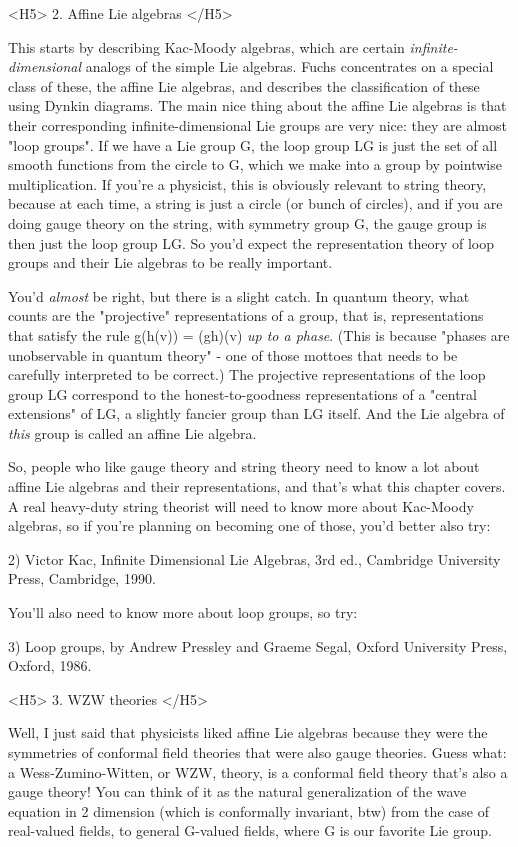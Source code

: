 <H5> 2.  Affine Lie algebras </H5>

This starts by describing Kac-Moody algebras, which are certain
\emph{infinite-dimensional} analogs of the simple Lie algebras.  Fuchs
concentrates on a special class of these, the affine Lie algebras, and
describes the classification of these using Dynkin diagrams.  The main
nice thing about the affine Lie algebras is that their corresponding
infinite-dimensional Lie groups are very nice: they are almost "loop
groups".  If we have a Lie group G, the loop group LG is just the set of
all smooth functions from the circle to G, which we make into a group by
pointwise multiplication.  If you're a physicist, this is obviously
relevant to string theory, because at each time, a string is just a
circle (or bunch of circles), and if you are doing gauge theory on 
the string, with symmetry group G, the gauge group is then just the loop
group LG.  So you'd expect the representation theory of loop groups
and their Lie algebras to be really important.  

You'd \emph{almost} be right, but there is a slight catch.  In quantum
theory, what counts are the "projective" representations of a group,
that is, representations that satisfy the rule g(h(v)) = (gh)(v) 
\emph{up to a phase}.  (This is because "phases are unobservable in quantum
theory" - one of those mottoes that needs to be carefully interpreted
to be correct.)  The projective representations of the loop group LG
correspond to the honest-to-goodness representations of a "central
extensions" of LG, a slightly fancier group than LG itself.  And the
Lie algebra of \emph{this} group is called an affine Lie algebra.

So, people who like gauge theory and string theory need to know a
lot about affine Lie algebras and their representations, and that's
what this chapter covers.  A real heavy-duty string theorist will
need to know more about Kac-Moody algebras, so if you're planning
on becoming one of those, you'd better also try:

2) Victor Kac, Infinite Dimensional Lie Algebras, 3rd ed.,
Cambridge University Press, Cambridge, 1990.

You'll also need to know more about loop groups, so try:

3) Loop groups, by Andrew Pressley and Graeme Segal, Oxford University
Press, Oxford, 1986. 

<H5> 3.  WZW theories </H5>

Well, I just said that physicists liked affine Lie algebras because they
were the symmetries of conformal field theories that were also gauge
theories.  Guess what: a Wess-Zumino-Witten, or WZW, theory, is a
conformal field theory that's also a gauge theory!  You can think of it
as the natural generalization of the wave equation in 2 dimension (which
is conformally invariant, btw) from the case of real-valued fields, to
general G-valued fields, where G is our favorite Lie group.  

